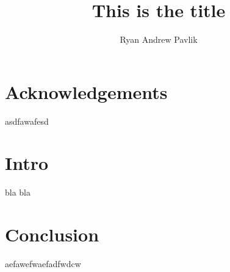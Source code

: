 \documentclass[capstoc,capschap,draftcls]{rpisudiss}
\title{This is the title}
\author{Ryan Andrew Pavlik}
\begin{document}
\maketitle

\tableofcontents
\listoffigures
\listoftables

\chapter{Acknowledgements}
asdfawafesd


\chapter{Intro}
bla bla


\chapter{Conclusion}

aefawefwaefadfwdcw
\end{document}

